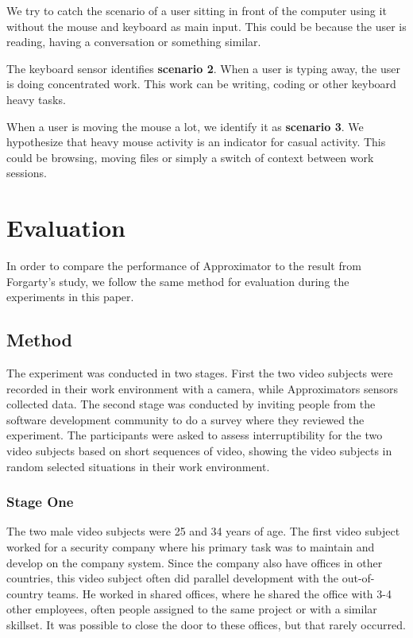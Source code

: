 \documentclass{sigchi}
\begin{document}
We try to catch the scenario of a user sitting in front of the computer using it without the mouse and keyboard as main input.
This could be because the user is reading, having a conversation or something similar.

The keyboard sensor identifies \textbf{scenario 2}.
When a user is typing away, the user is doing concentrated work.
This work can be writing, coding or other keyboard heavy tasks.

When a user is moving the mouse a lot, we identify it as \textbf{scenario 3}.
We hypothesize that heavy mouse activity is an indicator for casual activity.
This could be browsing, moving files or simply a switch of context between work sessions.


\section{Evaluation}
In order to compare the performance of Approximator to the result from Forgarty's study, we follow the same method for evaluation during the experiments in this paper.

\subsection{Method}
\label{method}
The experiment was conducted in two stages.
First the two video subjects were recorded in their work environment with a camera, while Approximators sensors collected data.
The second stage was conducted by inviting people from the software development community to do a survey where they reviewed the experiment.
The participants were asked to assess interruptibility for the two video subjects based on short sequences of video, showing the video subjects in random selected situations in their work environment.

\subsubsection{Stage One}
The two male video subjects were 25 and 34 years of age.
The first video subject worked for a security company where his primary task was to maintain and develop on the company system.
Since the company also have offices in other countries, this video subject often did parallel development with the out-of-country teams.
He worked in shared offices, where he shared the office with 3-4 other employees, often people assigned to the same project or with a similar skillset.
It was possible to close the door to these offices, but that rarely occurred.
\end{document}
